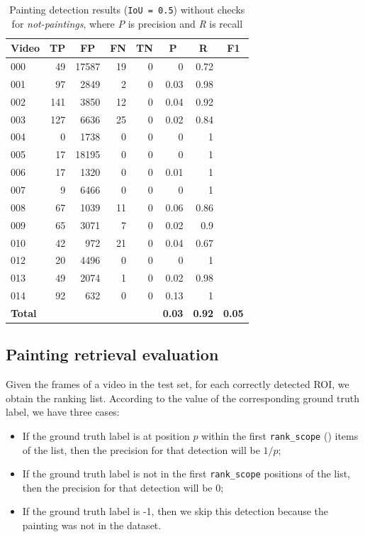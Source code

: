 \documentclass[10pt,twocolumn,letterpaper]{article}
\begin{document}
\begin{table}[]
\begin{center}
\begin{tabular}{lrrrrrrr}
\multicolumn{1}{c}{\textbf{Video}} & \multicolumn{1}{c}{\textbf{TP}} & \multicolumn{1}{c}{\textbf{FP}} & \multicolumn{1}{c}{\textbf{FN}} & \multicolumn{1}{c}{\textbf{TN}} & \multicolumn{1}{c}{\textbf{P}} & \multicolumn{1}{c}{\textbf{R}} & \multicolumn{1}{c}{\textbf{F1}} \\ \hline \hline
000 & 49 & 17587 & 19 & 0 & 0 & 0.72 &  \\
001 & 97 & 2849 & 2 & 0 & 0.03 & 0.98 &  \\
002 & 141 & 3850 & 12 & 0 & 0.04 & 0.92 &  \\
003 & 127 & 6636 & 25 & 0 & 0.02 & 0.84 &  \\
004 & 0 & 1738 & 0 & 0 & 0 & 1 &  \\
005 & 17 & 18195 & 0 & 0 & 0 & 1 &  \\
006 & 17 & 1320 & 0 & 0 & 0.01 & 1 &  \\
007 & 9 & 6466 & 0 & 0 & 0 & 1 &  \\
008 & 67 & 1039 & 11 & 0 & 0.06 & 0.86 &  \\
009 & 65 & 3071 & 7 & 0 & 0.02 & 0.9 &  \\
010 & 42 & 972 & 21 & 0 & 0.04 & 0.67 &  \\
012 & 20 & 4496 & 0 & 0 & 0 & 1 &  \\
013 & 49 & 2074 & 1 & 0 & 0.02 & 0.98 &  \\
014 & 92 & 632 & 0 & 0 & 0.13 & 1 &  \\ \hline \hline
\textbf{Total} &  &  &  &  & \textbf{0.03} & \textbf{0.92} & \textbf{0.05} \\
\end{tabular}
\end{center}
\caption{Painting detection results (\texttt{IoU = 0.5}) without checks for \textit{not-paintings}, where \textit{P} is precision and \textit{R} is recall}
\label{tab:PaintingDetectionResults2}
\end{table}

\subsection{Painting retrieval evaluation}
\label{subsec:PaintingRetrievalEvaluation}
Given the frames of a video in the test set, for each correctly detected ROI, we obtain the ranking list. According to the value of the corresponding ground truth label, we have three cases:
\begin{itemize}
    \item If the ground truth label is at position $p$ within the first \texttt{rank\_scope} () items of the list, then the precision for that detection will be $1/p$;
    \item If the ground truth label is not in the first \texttt{rank\_scope} positions of the list, then the precision for that detection will be 0;
    \item If the ground truth label is -1, then we skip this detection because the painting was not in the dataset.
\end{itemize}
\end{document}
